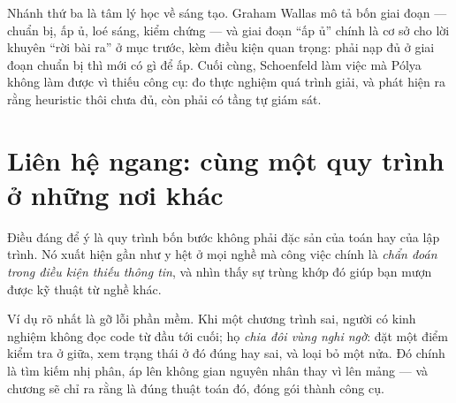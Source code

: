 \documentclass[../../algorithm.tex]{subfiles}
\begin{document}
Nhánh thứ ba là tâm lý học về sáng tạo. Graham Wallas mô tả bốn giai đoạn --- chuẩn bị, ấp ủ, loé sáng, kiểm chứng --- và giai đoạn ``ấp ủ'' chính là cơ sở cho lời khuyên ``rời bài ra'' ở mục trước, kèm điều kiện quan trọng: phải nạp đủ ở giai đoạn chuẩn bị thì mới có gì để ấp. Cuối cùng, Schoenfeld làm việc mà Pólya không làm được vì thiếu công cụ: đo thực nghiệm quá trình giải, và phát hiện ra rằng heuristic thôi chưa đủ, còn phải có tầng tự giám sát\cite{schoenfeld1985}.

\begin{gocre}
\end{gocre}

\section{Liên hệ ngang: cùng một quy trình ở những nơi khác}

Điều đáng để ý là quy trình bốn bước không phải đặc sản của toán hay của lập trình. Nó xuất hiện gần như y hệt ở mọi nghề mà công việc chính là \emph{chẩn đoán trong điều kiện thiếu thông tin}, và nhìn thấy sự trùng khớp đó giúp bạn mượn được kỹ thuật từ nghề khác.

Ví dụ rõ nhất là gỡ lỗi phần mềm. Khi một chương trình sai, người có kinh nghiệm không đọc code từ đầu tới cuối; họ \emph{chia đôi vùng nghi ngờ}: đặt một điểm kiểm tra ở giữa, xem trạng thái ở đó đúng hay sai, và loại bỏ một nửa. Đó chính là tìm kiếm nhị phân, áp lên không gian nguyên nhân thay vì lên mảng --- và chương  sẽ chỉ ra rằng  là đúng thuật toán đó, đóng gói thành công cụ.
\end{document}
